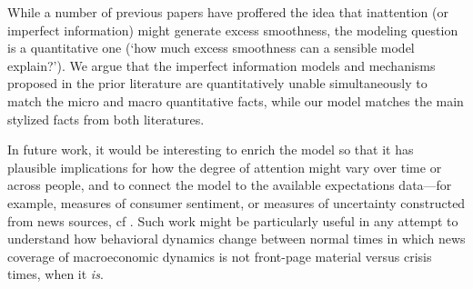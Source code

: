 \documentclass[titlepage]{./econtex}
\begin{document}
While a number of previous papers have proffered the idea that inattention (or imperfect information) might generate excess smoothness, the modeling question is a quantitative one (`how much excess smoothness can a sensible model explain?').  We argue that the imperfect information models and mechanisms proposed in the prior literature are quantitatively unable simultaneously to match the micro and macro quantitative facts, while our model matches the main stylized facts from both literatures.

In future work, it would be interesting to enrich the model so that it has plausible implications for how the degree of attention might vary over time or across people, and to connect the model to the available expectations data---for example, measures of consumer sentiment, or measures of uncertainty constructed from news sources, cf \cite{bbdUncertainty}.  Such work might be particularly useful in any attempt to understand how behavioral dynamics change between normal times in which news coverage of macroeconomic dynamics is not front-page material versus crisis times, when it {\it is}.


\processdelayedfloats

\small

\normalsize
\end{document}

